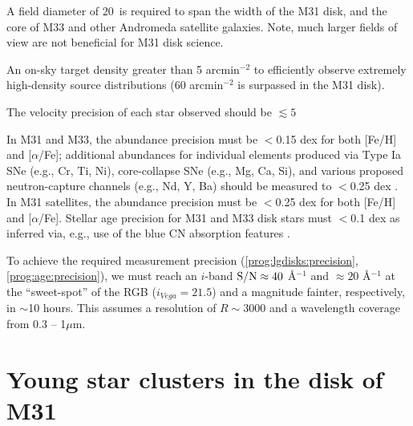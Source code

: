 \documentclass[11pt,a4paper,twoside,onecolumn,openany,final,oldfontcommands]{memoir}
\begin{document}
\medskip
\begin{sciencerequirement}

\reqitem A field diameter of 20\arcmin\ is required to span the width of the M31 disk, and the core of M33 and other Andromeda satellite galaxies.  Note, much larger fields of view are not beneficial for M31 disk science.

\reqitem An on-sky target density greater than 5 arcmin$^{-2}$ to efficiently observe extremely high-density source distributions (60 arcmin$^{-2}$ is surpassed in the M31 disk).

\reqitem The velocity precision of each star observed should be $\lesssim 5$ \kms 

\reqitem In M31 and M33, the abundance precision must be $<$0.15 dex for both [Fe/H] and [$\alpha$/Fe]; additional abundances for individual elements produced via Type Ia SNe (e.g., Cr, Ti, Ni), core-collapse SNe (e.g., Mg, Ca, Si), and various proposed neutron-capture channels (e.g., Nd, Y, Ba) should be measured to $<$0.25 dex \citep[Fig.~\ref{fig:abundances_snr}; cf.][]{Sandford20}. \label{prog:lgdisks:precision}
\reqitem In M31 satellites, the abundance precision must be $<$0.25 dex for both [Fe/H] and [$\alpha$/Fe].
\reqitem Stellar age precision for M31 and M33 disk stars must $<$0.1 dex as inferred via, e.g., use of the blue CN absorption features \citep[e.g.][]{Martig16,Ting19}.  %
\label{prog:age:precision}

\reqitem To achieve the required measurement precision (\ref{prog:lgdisks:precision}, \ref{prog:age:precision}), we must reach an $i$-band ${\rm S/N} \approx 40$ \AA$^{-1}$ and $\approx 20$ \AA$^{-1}$ at the  ``sweet-spot'' of the RGB ($i_{Vega} = 21.5$) and a magnitude fainter, respectively, in $\sim$10 hours.  This assumes a resolution of $R\sim3000$ and a wavelength coverage from 0.3 -- 1$\mu$m.
\end{sciencerequirement}


\section{Young star clusters in the disk of M31}
\end{document}

